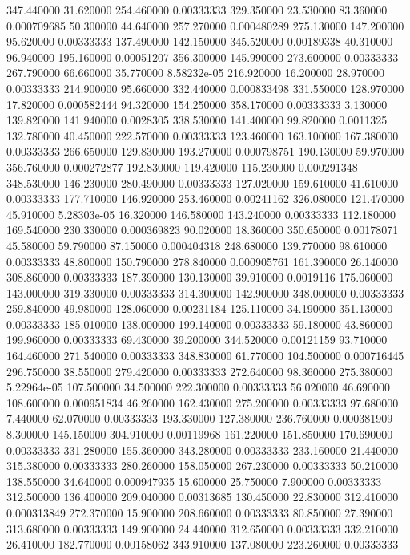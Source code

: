 347.440000	31.620000	254.460000	0.00333333
329.350000	23.530000	83.360000	0.000709685
50.300000	44.640000	257.270000	0.000480289
275.130000	147.200000	95.620000	0.00333333
137.490000	142.150000	345.520000	0.00189338
40.310000	96.940000	195.160000	0.00051207
356.300000	145.990000	273.600000	0.00333333
267.790000	66.660000	35.770000	8.58232e-05
216.920000	16.200000	28.970000	0.00333333
214.900000	95.660000	332.440000	0.000833498
331.550000	128.970000	17.820000	0.000582444
94.320000	154.250000	358.170000	0.00333333
3.130000	139.820000	141.940000	0.0028305
338.530000	141.400000	99.820000	0.0011325
132.780000	40.450000	222.570000	0.00333333
123.460000	163.100000	167.380000	0.00333333
266.650000	129.830000	193.270000	0.000798751
190.130000	59.970000	356.760000	0.000272877
192.830000	119.420000	115.230000	0.000291348
348.530000	146.230000	280.490000	0.00333333
127.020000	159.610000	41.610000	0.00333333
177.710000	146.920000	253.460000	0.00241162
326.080000	121.470000	45.910000	5.28303e-05
16.320000	146.580000	143.240000	0.00333333
112.180000	169.540000	230.330000	0.000369823
90.020000	18.360000	350.650000	0.00178071
45.580000	59.790000	87.150000	0.000404318
248.680000	139.770000	98.610000	0.00333333
48.800000	150.790000	278.840000	0.000905761
161.390000	26.140000	308.860000	0.00333333
187.390000	130.130000	39.910000	0.0019116
175.060000	143.000000	319.330000	0.00333333
314.300000	142.900000	348.000000	0.00333333
259.840000	49.980000	128.060000	0.00231184
125.110000	34.190000	351.130000	0.00333333
185.010000	138.000000	199.140000	0.00333333
59.180000	43.860000	199.960000	0.00333333
69.430000	39.200000	344.520000	0.00121159
93.710000	164.460000	271.540000	0.00333333
348.830000	61.770000	104.500000	0.000716445
296.750000	38.550000	279.420000	0.00333333
272.640000	98.360000	275.380000	5.22964e-05
107.500000	34.500000	222.300000	0.00333333
56.020000	46.690000	108.600000	0.000951834
46.260000	162.430000	275.200000	0.00333333
97.680000	7.440000	62.070000	0.00333333
193.330000	127.380000	236.760000	0.000381909
8.300000	145.150000	304.910000	0.00119968
161.220000	151.850000	170.690000	0.00333333
331.280000	155.360000	343.280000	0.00333333
233.160000	21.440000	315.380000	0.00333333
280.260000	158.050000	267.230000	0.00333333
50.210000	138.550000	34.640000	0.000947935
15.600000	25.750000	7.900000	0.00333333
312.500000	136.400000	209.040000	0.00313685
130.450000	22.830000	312.410000	0.000313849
272.370000	15.900000	208.660000	0.00333333
80.850000	27.390000	313.680000	0.00333333
149.900000	24.440000	312.650000	0.00333333
332.210000	26.410000	182.770000	0.00158062
343.910000	137.080000	223.260000	0.00333333
